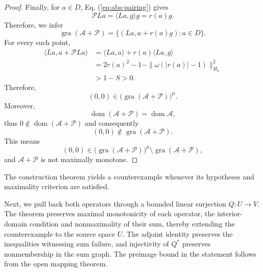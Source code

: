 \documentclass[11pt]{article}
\newcommand{\gra}{\operatorname{gra}}
\newcommand{\dom}{\operatorname{dom}}
\newcommand{\pair}[2]{\langle #1,#2\rangle}
\theoremstyle{definition}
\theoremstyle{remark}
\begin{document}
\begin{proof}
Finally, for $a\in D$, Eq. (\ref{eq:abs-pairing}) gives
\[
\mathcal PLa
=
\pair{La}{g}g
=
r(a)g.
\]
Therefore, we infer 
\[
\gra(\mathcal A+\mathcal P)
=
\{(La,a+r(a)g):a\in D\}.
\]
For every such point,
\[
\begin{aligned}
\pair{La}{a+\mathcal PLa}
&=\pair{La}{a}+r(a)\pair{La}{g}\\
&=2r(a)^2-1-\|\omega(|r(a)|-1)\|_{H_0}^2\\
&>1-S>0.
\end{aligned}
\]
Therefore,
\[
(0,0)\in
\bigl(\gra(\mathcal A+\mathcal P)\bigr)^\mu.
\]
Moreover,
\[
\dom(\mathcal A+\mathcal P)
=
\dom\mathcal A,
\]
thus $0\notin\dom(\mathcal A+\mathcal P)$ and consequently
\[
(0,0)\notin\gra(\mathcal A+\mathcal P).
\]
This means
\[
(0,0)\in
\bigl(\gra(\mathcal A+\mathcal P)\bigr)^\mu
\setminus
\gra(\mathcal A+\mathcal P),
\]
and $\mathcal A+\mathcal P$ is not maximally monotone.
\end{proof}

The construction theorem yields a counterexample whenever its hypotheses and maximality criterion are satisfied.

Next, we pull back both operators through a bounded linear surjection $Q:U\to V$. The theorem preserves maximal monotonicity of each operator, the interior-domain condition and nonmaximality of their sum, thereby extending the counterexample to the source space $U$. The adjoint identity preserves the inequalities witnessing sum failure, and injectivity of $Q^*$ preserves nonmembership in the sum graph. The preimage bound in the statement follows from the open mapping theorem.
\end{document}
